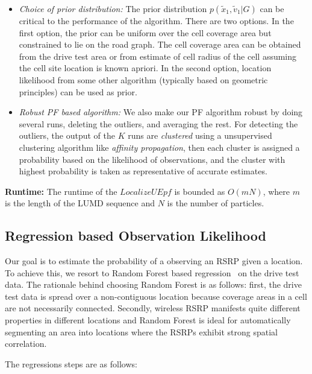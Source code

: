 \documentclass[conference, 10pt]{IEEEtran}
\begin{document}
\begin{itemize}
\item {\em Choice of prior distribution:} The prior distribution
	$p(\tilde{x}_1, \tilde{v}_1|G)$ can be critical to the performance of
	the algorithm. There are two options. In the first option, the prior can
	be uniform over the cell coverage area but constrained to lie on the
	road graph. The cell coverage area can be obtained from the drive test
	area or from estimate of cell radius of the cell assuming the cell site
	location is known apriori. In the second option, location likelihood
	from some other algorithm (typically based on geometric principles) can
	be used as prior.

\item {\em Robust PF based algorithm:} We also make our PF algorithm robust
	by doing several runs, deleting the outliers, and averaging the rest.
	For detecting the outliers, the output of the $K$ runs are {\em
	clustered} using a unsupervised clustering algorithm like {\em affinity
	propagation}, then each cluster is assigned a probability based on the
	likelihood of observations, and the cluster with highest probability is
	taken as representative of accurate estimates.

\end{itemize}


\textbf{Runtime:} The runtime of the $LocalizeUEpf$ is bounded as $O( m N)$,
where $m$ is the length of the LUMD sequence and $N$ is the number of particles.

\subsection{Regression based Observation Likelihood}
\label{sec:prob-reg}

Our goal is to estimate the probability of a observing an RSRP given a location.  To
achieve this, we resort to Random Forest based regression~\cite{BreimanRandFor} on
the drive test data.  The rationale behind choosing Random Forest is as follows:
first, the drive test data is spread over a non-contiguous location because coverage
areas in a cell are not necessarily connected.  Secondly, wireless RSRP
manifests quite different properties in different locations and Random Forest is ideal
for automatically segmenting an area into locations where the RSRPs
exhibit strong spatial correlation.

The regressions steps are as follows:
\end{document}
